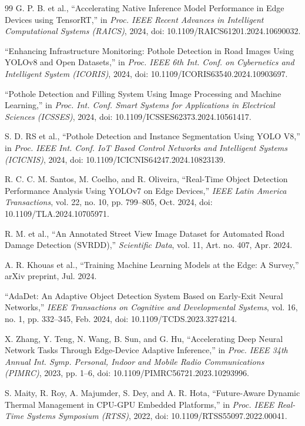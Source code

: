 \documentclass{ieeeaccess}
\begin{document}
\begin{thebibliography}{99}
G. P. B. et al., ``Accelerating Native Inference Model Performance in Edge Devices using TensorRT,'' in \textit{Proc. IEEE Recent Advances in Intelligent Computational Systems (RAICS)}, 2024, doi: 10.1109/RAICS61201.2024.10690032.

``Enhancing Infrastructure Monitoring: Pothole Detection in Road Images Using YOLOv8 and Open Datasets,'' in \textit{Proc. IEEE 6th Int. Conf. on Cybernetics and Intelligent System (ICORIS)}, 2024, doi: 10.1109/ICORIS63540.2024.10903697.

``Pothole Detection and Filling System Using Image Processing and Machine Learning,'' in \textit{Proc. Int. Conf. Smart Systems for Applications in Electrical Sciences (ICSSES)}, 2024, doi: 10.1109/ICSSES62373.2024.10561417.

S. D. RS et al., ``Pothole Detection and Instance Segmentation Using YOLO V8,'' in \textit{Proc. IEEE Int. Conf. IoT Based Control Networks and Intelligent Systems (ICICNIS)}, 2024, doi: 10.1109/ICICNIS64247.2024.10823139.

R. C. C. M. Santos, M. Coelho, and R. Oliveira, ``Real-Time Object Detection Performance Analysis Using YOLOv7 on Edge Devices,'' \textit{IEEE Latin America Transactions}, vol. 22, no. 10, pp. 799--805, Oct. 2024, doi: 10.1109/TLA.2024.10705971.

R. M. et al., ``An Annotated Street View Image Dataset for Automated Road Damage Detection (SVRDD),'' \textit{Scientific Data}, vol. 11, Art. no. 407, Apr. 2024.

A. R. Khouas et al., ``Training Machine Learning Models at the Edge: A Survey,'' arXiv preprint, Jul. 2024.

``AdaDet: An Adaptive Object Detection System Based on Early-Exit Neural Networks,'' \textit{IEEE Transactions on Cognitive and Developmental Systems}, vol. 16, no. 1, pp. 332--345, Feb. 2024, doi: 10.1109/TCDS.2023.3274214.

X. Zhang, Y. Teng, N. Wang, B. Sun, and G. Hu, ``Accelerating Deep Neural Network Tasks Through Edge-Device Adaptive Inference,'' in \textit{Proc. IEEE 34th Annual Int. Symp. Personal, Indoor and Mobile Radio Communications (PIMRC)}, 2023, pp. 1--6, doi: 10.1109/PIMRC56721.2023.10293996.

S. Maity, R. Roy, A. Majumder, S. Dey, and A. R. Hota, ``Future-Aware Dynamic Thermal Management in CPU-GPU Embedded Platforms,'' in \textit{Proc. IEEE Real-Time Systems Symposium (RTSS)}, 2022, doi: 10.1109/RTSS55097.2022.00041.


\end{thebibliography}
\end{document}
